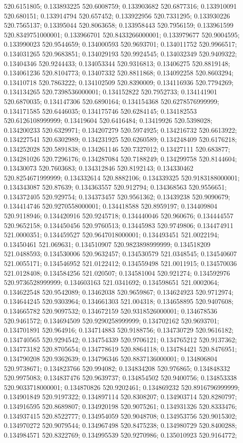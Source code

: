 520.6151805; 0.133893225 520.6008759; 0.133903682 520.6877316; 0.133910091 520.680151; 0.133914794 520.657452; 0.133922956 520.7331295; 0.133930226 520.7565137; 0.13395044 520.8063658; 0.133958443 520.7956159; 0.133961599 520.8349751000001; 0.133966701 520.8433266000001; 0.133979677 520.9004595; 0.133990023 520.9544659; 0.134000593 520.9693701; 0.134011752 520.9966517; 0.134031265 520.9683851; 0.134029193 520.9924545; 0.134032349 520.9409322; 0.13404346 520.9244433; 0.134053344 520.9316813; 0.13406275 520.8819148; 0.134061236 520.8104773; 0.13407332 520.8811868; 0.134092258 520.8603294; 0.13410718 520.7863222; 0.134102509 520.8390009; 0.134116936 520.7794269; 0.134134265 520.7398536000001; 0.134152822 520.7952733; 0.134141901 520.6870035; 0.134147306 520.6890164; 0.134154368 520.6278576999999; 0.134171585 520.6446035; 0.134175746 520.6284145; 0.134182553 520.6126108999999; 0.13419604 520.6416484; 0.13419926 520.5398028; 0.134200233 520.6329971; 0.134207279 520.5974925; 0.134216732 520.6613922; 0.134227541 520.6302989; 0.134231925 520.6260589; 0.134248409 520.6176218; 0.134252028 520.5891838; 0.134261146 520.7327012; 0.13427111 520.683877; 0.134281026 520.7296176; 0.134287084 520.7188249; 0.134299758 520.8144604; 0.13430073 520.7603683; 0.134312846 520.8192143; 0.134330462 520.8254671999999; 0.134332614 520.8882106; 0.134339325 520.9183188000001; 0.134343087 520.87639; 0.134363557 520.912794; 0.134368563 520.9556651; 0.134372405 520.929754; 0.134373457 520.9561362; 0.13439238 520.9090679; 0.134414746 520.9270558000001; 0.134418588 520.8959197; 0.134409804 520.9118946; 0.134420916 520.9245718; 0.134440046 520.960676; 0.134444557 520.9652158; 0.134450456 520.9760513; 0.13445983 520.9749806; 0.134474911 521.0000351; 0.134459527 520.9647018000001; 0.134493451 521.0022194; 0.13450461 521.069631; 0.134510907 520.9823898999999; 0.134518209 521.0488593; 0.134530006 520.9632457; 0.134530579 521.0348545; 0.134540607 521.0055171; 0.134546952 521.0122412; 0.134559498 521.0011915; 0.134570036 521.0128408; 0.134584256 521.020507; 0.134581004 520.921274; 0.134592976 520.9736528999999; 0.134603163 521.0341692; 0.134598651 521.0002064; 0.134622548 520.9542089; 0.13462038 520.9659867; 0.134624923 520.9712974; 0.134644245 520.9303964; 0.134661303 521.004318; 0.134658895 520.9407608; 0.134665782 520.9097532; 0.134672159 520.9318526000001; 0.134678536 520.9461572; 0.134694509 520.9290258999999; 0.134702162 520.9693701; 0.134701891 520.964916; 0.134714883 520.9188756; 0.134730729 520.9616182; 0.134740565 520.9294542; 0.134754339 520.9706121; 0.134765212 520.9137362; 0.134773182 520.8705654; 0.134778619 520.8864118; 0.134784421 520.8476951; 0.134790208 520.9362639; 0.134796346 520.8837136000001; 0.134806804 520.9738671; 0.134823766 520.994082; 0.134834208 520.976865; 0.134848332 520.9975083; 0.134837476 520.9639737; 0.134854502 520.9400756; 0.134853338 520.9033718000001; 0.134870826 520.9202461; 0.134869232 520.8916796999999; 0.134901849 520.9197322; 0.134897114 520.8308207; 0.134903714 520.8280797; 0.134916595 520.8689807; 0.134920198 520.9075261; 0.134931326 520.8333476; 0.134937415 520.8522777; 0.134954059 520.9048708; 0.134953756 520.9015302; 0.134970272 520.9079544; 0.134967498 520.8475238; 0.134980729 520.8400288; 0.134984571 520.8322769; 0.134995539 520.9270986; 0.135010923 520.9164772; 